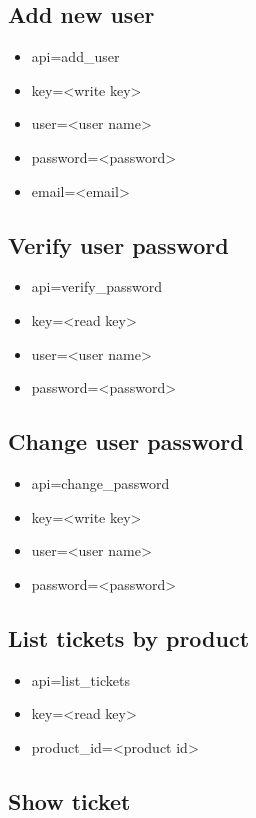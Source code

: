 \documentclass[11pt]{article}
\begin{document}
\subsection{Add new user}

\begin{itemize}
\item api=add\_user
\item key=<write key>
\item user=<user name>
\item password=<password>
\item email=<email>
\end{itemize}

\subsection{Verify user password}

\begin{itemize}
\item api=verify\_password
\item key=<read key>
\item user=<user name>
\item password=<password>
\end{itemize}

\subsection{Change user password}

\begin{itemize}
\item api=change\_password
\item key=<write key>
\item user=<user name>
\item password=<password>
\end{itemize}

\subsection{List tickets by product}

\begin{itemize}
\item api=list\_tickets
\item key=<read key>
\item product\_id=<product id>
\end{itemize}

\subsection{Show ticket}
\end{document}
